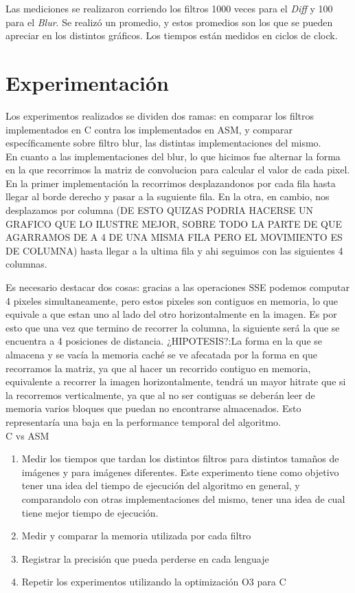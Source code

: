 \documentclass[10pt,a4paper,spanish]{article}
\begin{document}
Las mediciones se realizaron corriendo los filtros 1000 veces para el \textit{Diff} y 100 para el \textit{Blur}. Se realizó un promedio, y estos promedios son los que se pueden apreciar en los distintos gráficos. Los tiempos están medidos en ciclos de clock.

\section{Experimentación}

Los experimentos realizados se dividen dos ramas: en comparar los filtros implementados en C contra los implementados en ASM, y comparar específicamente sobre filtro blur, las distintas implementaciones del mismo. \\

En cuanto a las implementaciones del blur, lo que hicimos fue alternar la forma en la que recorrimos la matriz de convolucion para calcular el valor de cada pixel. En la primer implementación la recorrimos desplazandonos por cada fila hasta llegar al borde derecho y pasar a la suguiente fila. En la otra, en cambio, nos desplazamos por columna (DE ESTO QUIZAS PODRIA HACERSE UN GRAFICO QUE LO ILUSTRE MEJOR, SOBRE TODO LA PARTE DE QUE AGARRAMOS DE A 4 DE UNA MISMA FILA PERO EL MOVIMIENTO ES DE COLUMNA) hasta llegar a la ultima fila y ahi seguimos con las siguientes 4 columnas.

Es necesario destacar dos cosas: gracias a las operaciones SSE podemos computar 4 pixeles simultaneamente, pero estos pixeles son contiguos en memoria, lo que equivale a que estan uno al lado del otro horizontalmente en la imagen. Es por esto que una vez que termino de recorrer la columna, la siguiente será la que se encuentra a 4 posiciones de distancia.
¿HIPOTESIS?:La forma en la que se almacena y se vacía la memoria caché se ve afecatada por la forma en que recorramos la matriz, ya que al hacer un recorrido contiguo en memoria, equivalente a recorrer la imagen horizontalmente, tendrá un mayor hitrate que si la recorremos verticalmente, ya que al no ser contiguas se deberán leer de memoria varios bloques que puedan no encontrarse almacenados. Esto representaría una baja en la performance temporal del algoritmo. \\

C vs ASM

\begin{enumerate}
	\item Medir los tiempos que tardan los distintos filtros para distintos tamaños de imágenes y para imágenes diferentes. Este experimento tiene como objetivo tener una idea del tiempo de ejecución del algoritmo en general, y comparandolo con otras implementaciones del mismo, tener una idea de cual tiene mejor tiempo de ejecución.
	\item Medir y comparar la memoria utilizada por cada filtro
	\item Registrar la precisión que pueda perderse en cada lenguaje
	\item Repetir los experimentos utilizando la optimización O3 para C
\end{enumerate}
\end{document}
